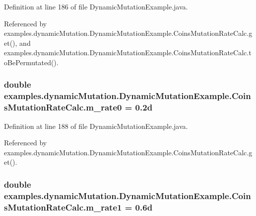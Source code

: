 Definition at line 186 of file Dynamic\-Mutation\-Example.\-java.



Referenced by examples.\-dynamic\-Mutation.\-Dynamic\-Mutation\-Example.\-Coins\-Mutation\-Rate\-Calc.\-get(), and examples.\-dynamic\-Mutation.\-Dynamic\-Mutation\-Example.\-Coins\-Mutation\-Rate\-Calc.\-to\-Be\-Permutated().

\hypertarget{classexamples_1_1dynamic_mutation_1_1_dynamic_mutation_example_1_1_coins_mutation_rate_calc_ade7ce4741a3e5a78bbf48e6cdb8cfbbd}{
\subsubsection[{m\-\_\-rate0}]{\setlength{\rightskip}{0pt plus 5cm}double examples.\-dynamic\-Mutation.\-Dynamic\-Mutation\-Example.\-Coins\-Mutation\-Rate\-Calc.\-m\-\_\-rate0 = 0.\-2d\hspace{0.3cm}{\ttfamily [private]}}}\label{classexamples_1_1dynamic_mutation_1_1_dynamic_mutation_example_1_1_coins_mutation_rate_calc_ade7ce4741a3e5a78bbf48e6cdb8cfbbd}


Definition at line 188 of file Dynamic\-Mutation\-Example.\-java.



Referenced by examples.\-dynamic\-Mutation.\-Dynamic\-Mutation\-Example.\-Coins\-Mutation\-Rate\-Calc.\-get().

\hypertarget{classexamples_1_1dynamic_mutation_1_1_dynamic_mutation_example_1_1_coins_mutation_rate_calc_ad8b35f863c415cd957a70670bfdc1a19}{
\subsubsection[{m\-\_\-rate1}]{\setlength{\rightskip}{0pt plus 5cm}double examples.\-dynamic\-Mutation.\-Dynamic\-Mutation\-Example.\-Coins\-Mutation\-Rate\-Calc.\-m\-\_\-rate1 = 0.\-6d\hspace{0.3cm}{\ttfamily [private]}}}\label{classexamples_1_1dynamic_mutation_1_1_dynamic_mutation_example_1_1_coins_mutation_rate_calc_ad8b35f863c415cd957a70670bfdc1a19}


